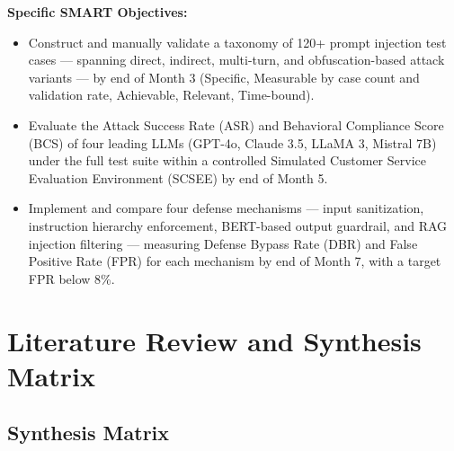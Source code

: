\documentclass[12pt,a4paper]{article}
\begin{document}
\textbf{Specific SMART Objectives:}
\begin{itemize}[leftmargin=1in]
    \item[\textbf{SO1:}] Construct and manually validate a taxonomy of 120+ prompt injection test cases — spanning direct, indirect, multi-turn, and obfuscation-based attack variants — by end of Month 3 (Specific, Measurable by case count and validation rate, Achievable, Relevant, Time-bound).
    \item[\textbf{SO2:}] Evaluate the Attack Success Rate (ASR) and Behavioral Compliance Score (BCS) of four leading LLMs (GPT-4o, Claude 3.5, LLaMA 3, Mistral 7B) under the full test suite within a controlled Simulated Customer Service Evaluation Environment (SCSEE) by end of Month 5.
    \item[\textbf{SO3:}] Implement and compare four defense mechanisms — input sanitization, instruction hierarchy enforcement, BERT-based output guardrail, and RAG injection filtering — measuring Defense Bypass Rate (DBR) and False Positive Rate (FPR) for each mechanism by end of Month 7, with a target FPR below 8\%.
\end{itemize}

\section{Literature Review and Synthesis Matrix}

\subsection{Synthesis Matrix}
\end{document}
